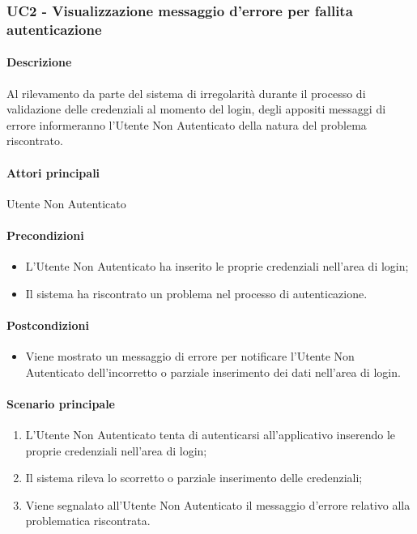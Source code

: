 \subsubsection{UC2 - Visualizzazione messaggio d'errore per fallita autenticazione}\label{UC2}
\paragraph*{Descrizione}
Al rilevamento da parte del sistema di irregolarità durante il processo di validazione delle credenziali al momento del login, degli appositi messaggi di errore informeranno l’Utente Non Autenticato della natura del problema riscontrato.

\paragraph*{Attori principali}
Utente Non Autenticato

\paragraph*{Precondizioni}
\begin{itemize}
  \item L’Utente Non Autenticato ha inserito le proprie credenziali nell’area di login;
  \item Il sistema ha riscontrato un problema nel processo di autenticazione.  
\end{itemize}

\paragraph*{Postcondizioni}
\begin{itemize}
  \item Viene mostrato un messaggio di errore per notificare l’Utente Non Autenticato dell’incorretto o parziale inserimento dei dati nell’area di login.
\end{itemize}

\paragraph*{Scenario principale}
\begin{enumerate}
  \item L’Utente Non Autenticato tenta di autenticarsi all’applicativo inserendo le proprie credenziali nell’area di login;
  \item Il sistema rileva lo scorretto o parziale inserimento delle credenziali;
  \item Viene segnalato all’Utente Non Autenticato il messaggio d’errore relativo alla problematica riscontrata.  
\end{enumerate}

